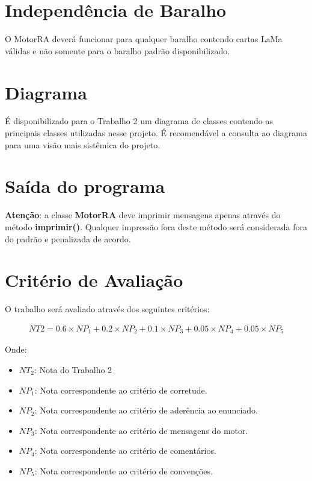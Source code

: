 \documentclass[10pt]{article}
\begin{document}
\section{Independência de Baralho}

O MotorRA deverá funcionar para qualquer baralho contendo cartas LaMa válidas e não somente para o baralho padrão disponibilizado.

\section{Diagrama} \label{sec:diagrama}

É disponibilizado para o Trabalho 2 um diagrama de classes contendo as principais classes utilizadas nesse projeto. É recomendável a consulta ao diagrama para uma visão mais sistêmica do projeto.

\section{Saída do programa}

\textbf{Atenção}: a classe \textbf{MotorRA} deve imprimir mensagens apenas através do método \textbf{imprimir()}. Qualquer impressão fora deste método será considerada fora do padrão e penalizada de acordo.

\section{Critério de Avaliação}

O trabalho será avaliado através dos seguintes critérios:

\begin{align}
NT2 = 0.6 \times NP_1 + 0.2 \times NP_2 + 0.1 \times NP_3 + 0.05 \times NP_4 + 0.05 \times NP_5
\end{align}

Onde:

\begin{itemize}
    \item $NT_2$: Nota do Trabalho 2
    \item $NP_1$: Nota correspondente ao critério de corretude.
    \item $NP_2$: Nota correspondente ao critério de aderência ao enunciado.
    \item $NP_3$: Nota correspondente ao critério de mensagens do motor.
    \item $NP_4$: Nota correspondente ao critério de comentários.
    \item $NP_5$: Nota correspondente ao critério de convenções.
\end{itemize}
\end{document}
